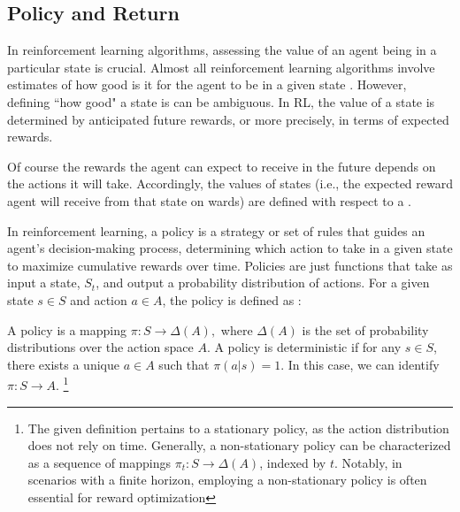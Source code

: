 \subsection{Policy and Return}
In reinforcement learning algorithms, assessing the value of an agent being in a particular state is crucial. 
Almost all reinforcement learning algorithms involve estimates of how good is it for the agent to be in a given state \cite{RL}.
However, defining ``how good" a state is can be ambiguous. In RL, the value of a state is determined by anticipated future rewards, or more precisely, in terms of expected rewards.

Of course the rewards the agent can expect to receive in the future depends on the actions it will take. Accordingly, the values of states (i.e., the expected reward agent will receive from that state on wards) are defined with respect to a .

In reinforcement learning, a policy is a strategy or set of rules that guides an agent's decision-making process, determining which action to take in a given state to maximize cumulative rewards over time. Policies are just functions that take as input a state, $S_t$, and output a probability distribution of actions.
For a given state $s \in S$ and action $a \in A$, the policy is defined as \cite{mohri2018}:
\begin{definition}[Policy]
    A policy is a mapping $\pi: S \to \Delta(A),$ where $\Delta(A)$ is the set of probability distributions over the action space $A$. A policy is deterministic if for any $s \in S$, there exists a unique $a \in A$ such that $\pi(a|s) = 1$. In this case, we can identify $\pi: S \to A$.
    \footnote{The given definition pertains to a stationary policy, as the action distribution does not rely on time. Generally, a non-stationary policy can be characterized as a sequence of mappings $\pi_t : S \rightarrow \Delta(A)$, indexed by $t$. Notably, in scenarios with a finite horizon, employing a non-stationary policy is often essential for reward optimization}
\end{definition}







